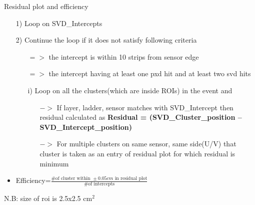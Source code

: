 \documentclass[xcolor=dvipsnames]{beamer}
\begin{document}
\begin{frame}{Residual plot and efficiency}

		\begin{itemize}
			\item[1)] Loop on SVD\_Intercepts
			\item[2)] Continue the loop if it does not satisfy following criteria
			\begin{itemize}
			\item[$=>$] the intercept is within 10 strips from sensor edge
			\item[$=>$] the intercept having at least  one pxd hit and at least two svd hits
			\end{itemize}
		\begin{itemize}
				
				\item[i)]Loop on all the clusters(which are inside ROIs) in the event and 
				\begin{itemize}
					\item[$->$] If layer, ladder, sensor matches with SVD\_Intercept then residual calculated as \textbf{ Residual = (SVD\_Cluster\_position -- SVD\_Intercept\_position)} 
					\item[$->$] For multiple clusters on same sensor, same side(U/V) that cluster is taken as an entry of residual plot  for which residual is minimum				   
				\end{itemize}		
			\end{itemize} 					
		\end{itemize}
		\begin{itemize}
			\item Efficiency=$\frac{\text{\# of cluster within }\pm0.05 cm\text{ in residual plot}}{\text{\# of intercepts}}$			
		\end{itemize}
N.B: size of roi is 2.5x2.5 $\text{cm}^2$

\end{frame}
\end{document}
